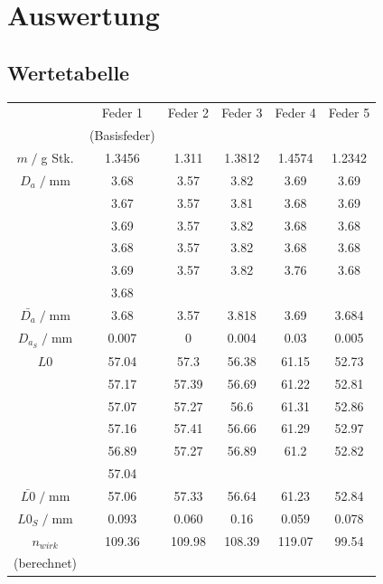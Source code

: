 \newpage
\section{Auswertung}
\subsection{Wertetabelle}
\begin{table}[H]
    \centering
    \begin{tabular}{c | c c c c c}
        \toprule
        & Feder 1 & Feder 2 & Feder 3 & Feder 4 & Feder 5 \\ & (Basisfeder)\\
        \midrule
        $m\;/\;$g Stk. & 1.3456 & 1.311 & 1.3812 & 1.4574 & 1.2342 \\
        \midrule
        $D_a\;/\;$mm & 3.68 & 3.57 & 3.82 & 3.69 & 3.69 \\
          & 3.67 & 3.57 & 3.81 & 3.68 & 3.69 \\
          & 3.69 & 3.57 & 3.82 & 3.68 & 3.68 \\
          & 3.68 & 3.57 & 3.82 & 3.68 & 3.68 \\
          & 3.69 & 3.57 & 3.82 & 3.76 & 3.68 \\
          & 3.68 &         &         &         &         \\
        \midrule
        $\bar{D_a}\;/\;$mm & 3.68  & 3.57 & 3.818 & 3.69 & 3.684\\
        $D_{a_S}\;/\;$mm& 0.007 & 0 & 0.004 & 0.03 & 0.005\\
        \midrule
        $L0$ 	& 57.04 	& 57.3 		& 56.38 	& 61.15 	& 52.73 	\\
                & 57.17 	& 57.39 	& 56.69 	& 61.22 	& 52.81 	\\
                & 57.07 	& 57.27 	& 56.6 		& 61.31 	& 52.86 	\\
                & 57.16 	& 57.41 	& 56.66 	& 61.29 	& 52.97 	\\
                & 56.89 	& 57.27 	& 56.89 	& 61.2 		& 52.82 	\\
                & 57.04 	&         	&         	&         	&   \\
        \midrule
        $\bar{L0}\;/\;$mm & 57.06 	& 57.33 	& 56.64 	& 61.23 	& 52.84	\\
        $L0{_S}\;/\;$mm & 0.093 	& 0.060 	& 0.16 	& 0.059 	& 0.078	\\
        $n_{wirk}$ & 109.36 & 109.98 & 108.39 & 119.07 & 99.54 \\(berechnet)\\

\end{tabular}
\end{table}
